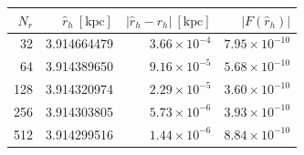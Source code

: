 \begin{tabular}{rrrr}\toprule
$N_r$ & $\widehat r_h\ [\mathrm{kpc}]$ & $|\widehat r_h-r_h|\ [\mathrm{kpc}]$ & $|F(\widehat r_h)|$ \\
\midrule
32 & 3.914664479 & $3.66\times 10^{-4}$ & $7.95\times 10^{-10}$ \\
64 & 3.914389650 & $9.16\times 10^{-5}$ & $5.68\times 10^{-10}$ \\
128 & 3.914320974 & $2.29\times 10^{-5}$ & $3.60\times 10^{-10}$ \\
256 & 3.914303805 & $5.73\times 10^{-6}$ & $3.93\times 10^{-10}$ \\
512 & 3.914299516 & $1.44\times 10^{-6}$ & $8.84\times 10^{-10}$ \\
\bottomrule\end{tabular}
